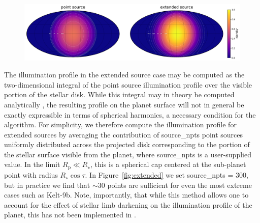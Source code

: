 \documentclass[modern]{aastex62}
\begin{document}
\begin{figure}[t!]
    \begin{centering}
        \includegraphics[width=\linewidth]{figures/extended.pdf}
    \end{centering}
\end{figure}

The illumination profile in the extended source case may be computed as the
two-dimensional integral of the point source illumination profile over
the visible portion of the stellar disk. While this integral may in theory be
computed analytically
\citep[see, for instance,][who derived series solutions to this problem]{Kopal1954},
the resulting profile on the planet surface
will not in general be exactly expressible in terms of spherical harmonics, a
necessary condition for the \starry algorithm.
For simplicity, we therefore compute the illumination profile for
extended sources by averaging the contribution of \textsf{source\_npts} point
sources uniformly distributed across the projected disk corresponding to
the portion of the stellar surface
visible from the planet, where \textsf{source\_npts} is a user-supplied
value. In the limit $R_\mathrm{p} \ll R_\star$, this is a spherical cap centered at
the sub-planet point with radius $R_\star \cos\tau$. In
Figure~\ref{fig:extended} we set
\textsf{source\_npts} = 300, but in practice we find that ${\sim}30$
points are sufficient for even the most extreme cases such as Kelt-9b.
%
Note, importantly, that while this method allows one to account for the
effect of stellar limb darkening on the illumination profile of the planet,
this has not been implemented in \starry.
\end{document}
